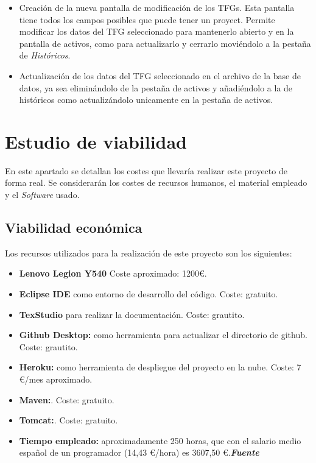 \begin{itemize}
\begin{itemize}
		\item Creación de la nueva pantalla de modificación de los TFGs. Esta pantalla tiene todos los campos posibles que puede tener un proyect. Permite modificar los datos del TFG seleccionado para mantenerlo abierto y en la pantalla de activos, como para actualizarlo y cerrarlo moviéndolo a la pestaña de \emph{Históricos}.
		\item Actualización de los datos del TFG seleccionado en el archivo de la base de datos, ya sea eliminándolo de la pestaña de activos y añadiéndolo a la de históricos como actualizándolo unicamente en la pestaña de activos.
	\end{itemize}
\end{itemize}

\section{Estudio de viabilidad}
En este apartado se detallan los costes que llevaría realizar este proyecto de forma real. Se considerarán los costes de recursos humanos, el material empleado y el \emph{Software} usado. 

\subsection{Viabilidad económica}
Los recursos utilizados para la realización de este proyecto son los siguientes:
\begin{itemize}
	\item  \textbf{Lenovo Legion Y540} Coste aproximado: 1200€.
	\item  \textbf{Eclipse IDE} como entorno de desarrollo del código. Coste: gratuito.
	\item  \textbf{TexStudio} para realizar la documentación. Coste: grautito.
	\item  \textbf{Github Desktop:} como herramienta para actualizar el directorio de github. Coste: grautito.
	\item \textbf{Heroku:} como herramienta de despliegue del proyecto en la nube. Coste: 7 €/mes aproximado.
	\item \textbf{Maven:}. Coste: gratuito.
	\item \textbf{Tomcat:}. Coste: gratuito.
	\item \textbf{Tiempo empleado:} aproximadamente 250 horas, que con el salario medio español de un programador (14,43 €/hora) es 3607,50 €.\textbf{\textit{Fuente}}~\cite{SalarioProgramador}
\end{itemize}


